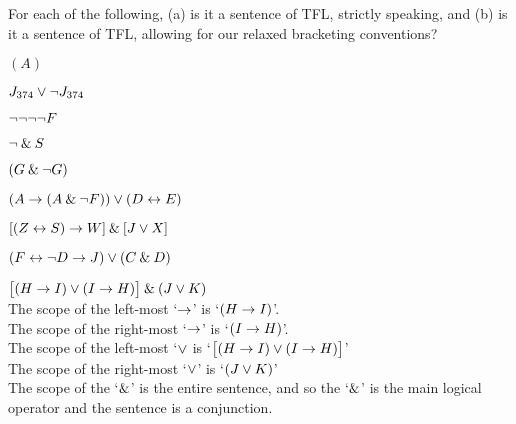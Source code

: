 \problempart
\label{pr.wiffTFL}
For each of the following, (a) is it a sentence of TFL, strictly speaking, and (b) is it a sentence of TFL, allowing for our relaxed bracketing conventions?
\begin{earg}
\item $(A)$\hfill {}
\medskip

\item $J_{374} \vee {\neg} J_{374}$ \hfill {}
\medskip

\item ${\neg} {\neg} {\neg} {\neg} F$ \hfill {}
\medskip

\item ${\neg} \mathbin{\&} S$\hfill {}
\medskip

\item $(G \mathbin{\&} {\neg} G)$\hfill {}
\medskip

\item $(A \rightarrow (A \mathbin{\&} {\neg} F)) \vee (D \leftrightarrow E)$\hfill {}
\medskip

\item $[(Z \leftrightarrow S) \rightarrow W] \mathbin{\&} [J \vee X]$\hfill {}
\medskip

\item $(F \leftrightarrow {\neg} D \rightarrow J) \vee (C \mathbin{\&} D)$\hfill {}
\medskip
\end{earg}



\problempart
$\bigl[(H \rightarrow I) \vee (I \rightarrow H)\bigr] \mathbin{\&} (J \vee K)$\\
The scope of the left-most `$\rightarrow$' is `$(H \rightarrow I)$'.\\
The scope of the right-most `$\rightarrow$' is `$(I \rightarrow H)$'.\\
The scope of the left-most `$\vee$ is `$\bigl[(H \rightarrow I) \vee (I \rightarrow H)\bigr]$'\\
The scope of the right-most `$\vee$' is `$(J \vee K)$'\\
The scope of the `$\mathbin{\&}$' is the entire sentence, and so the `$\mathbin{\&}$' is the main logical operator and the sentence is a conjunction.





